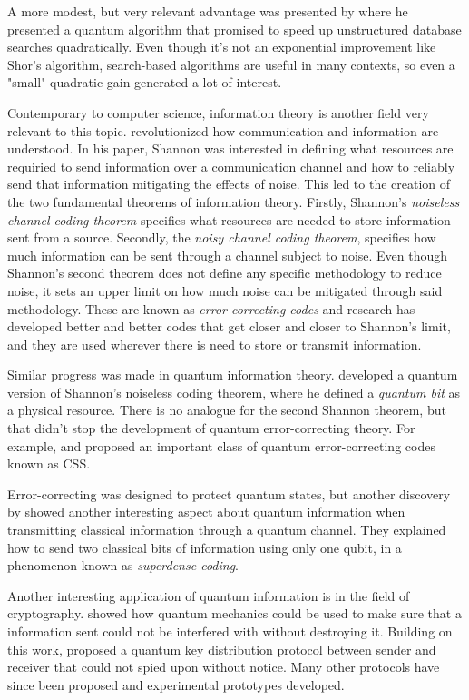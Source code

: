 \documentclass[../../dissertation.tex]{subfiles}
\begin{document}
A more modest, but very relevant advantage was presented by \cite{grover1996}
where he presented a quantum algorithm that promised to speed up unstructured
database searches quadratically. Even though it's not an exponential
improvement like Shor's algorithm, search-based algorithms are useful in many
contexts, so even a "small" quadratic gain generated a lot of interest.\par

Contemporary to computer science, information theory is another field very
relevant to this topic. \cite{shannon48} revolutionized how communication and
information are understood. In his paper, Shannon was interested in defining
what resources are requiried to send information over a communication channel
and how to reliably send that information mitigating the effects of noise. This
led to the creation of the two fundamental theorems of information theory.
Firstly, Shannon's \textit{noiseless channel coding theorem} specifies what
resources are needed to store information sent from a source. Secondly, the
\textit{noisy channel coding theorem}, specifies how much information can be
sent through a channel subject to noise. Even though Shannon's second theorem
does not define any specific methodology to reduce noise, it sets an upper
limit on how much noise can be mitigated through said methodology. These are
known as \textit{error-correcting codes} and research has developed better and
better codes that get closer and closer to Shannon's limit, and they are used
wherever there is need to store or transmit information.\par 

Similar progress was made in quantum information theory. \cite{schumacher95}
developed a quantum version of Shannon's noiseless coding theorem, where he
defined a \textit{quantum bit} as a physical resource. There is no analogue for
the second Shannon theorem, but that didn't stop the development of quantum
error-correcting theory. For example, \cite{shorcalder96} and \cite{steane96}
proposed an important class of quantum error-correcting codes known as CSS.\par

Error-correcting was designed to protect quantum states, but another discovery
by \cite{wisnerbennet92} showed another interesting aspect about quantum
information when transmitting classical information through a quantum channel.
They explained how to send two classical bits of information using only one
qubit, in a phenomenon known as \textit{superdense coding}.\par Another
interesting application of quantum information is in the field of cryptography.
\cite{wisner60} showed how quantum mechanics could be used to make sure that a
information sent could not be interfered with without destroying it. Building
on this work, \cite{bennetbassard84} proposed a quantum key distribution
protocol between sender and receiver that could not spied upon without notice.
Many other protocols have since been proposed and experimental prototypes
developed.\par
\end{document}
